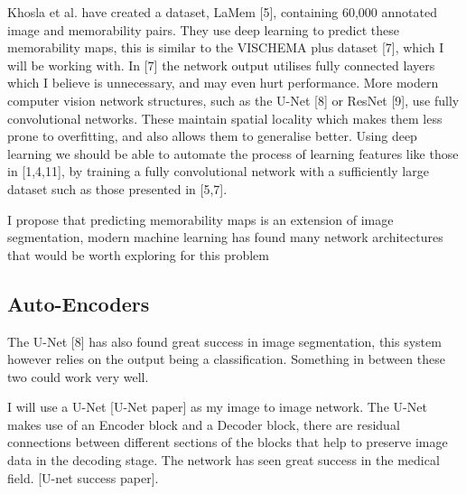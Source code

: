 \documentclass{UoYCSproject}
\begin{document}
Khosla et al. have created a dataset, LaMem [5], containing 60,000 annotated image and memorability pairs. They use deep learning to predict these memorability maps, this is similar to the VISCHEMA plus dataset [7], which I will be working with. In [7] the network output utilises fully connected layers which I believe is unnecessary, and may even hurt performance. More modern computer vision network structures, such as the U-Net [8] or ResNet [9], use fully convolutional networks. These maintain spatial locality which makes them less prone to overfitting, and also allows them to generalise better. Using deep learning we should be able to automate the process of learning features like those in [1,4,11], by training a fully convolutional network with a sufficiently large dataset such as those presented in [5,7].

I propose that predicting memorability maps is an extension of image segmentation, modern machine learning has found many network architectures that would be worth exploring for this problem

\subsection{Auto-Encoders}


The U-Net [8] has also found great success in image segmentation, this system however relies on the output being a classification. Something in between these two could work very well.

I will use a U-Net [U-Net paper] as my image to image network. The U-Net makes use of an Encoder block and a Decoder block, there are residual connections between different sections of the blocks that help to preserve image data in the decoding stage. The network has seen great success in the medical field. [U-net success paper].
\end{document}
